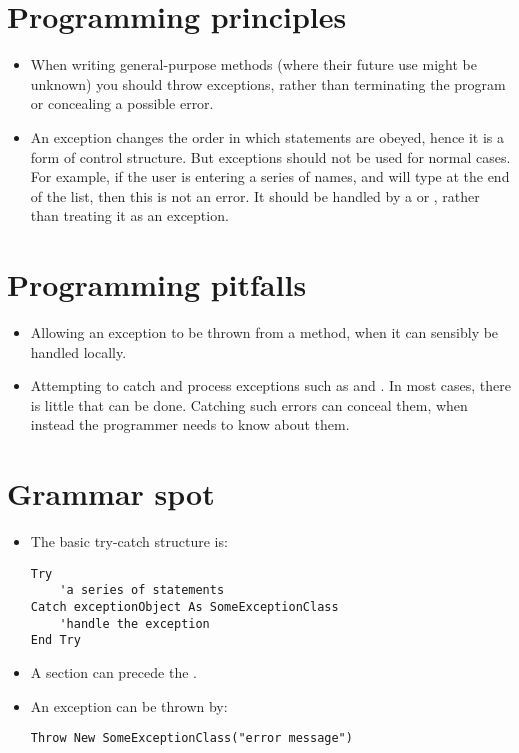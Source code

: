 	\section{Programming principles}
		\begin{itemize}
      \item When writing general-purpose methods (where their future use might be unknown) you should throw exceptions, rather than terminating the program or concealing a possible error.
      \item An exception changes the order in which statements are obeyed, hence it is a form of control structure. But exceptions should not be used for normal cases. 
				For example, if the user is entering a series of names, and will type  at the end of the list, then this is not an error. It should be handled by a  or , rather than treating it as an exception.
		\end{itemize}


	\section{Programming pitfalls}
		\begin{itemize}
      \item Allowing an exception to be thrown from a method, when it can sensibly be handled locally.
      \item Attempting to catch and process exceptions such as  and . In most cases, there is little that can be done. Catching such errors can conceal them, when instead the programmer needs to know about them.
		\end{itemize}


	\section{Grammar spot}
		\begin{itemize}
      \item The basic try-catch structure is:
				\begin{lstlisting}
Try
	'a series of statements
Catch exceptionObject As SomeExceptionClass
	'handle the exception
End Try
				\end{lstlisting}
      \item A  section can precede the .
      \item An exception can be thrown by:
				\begin{lstlisting}
Throw New SomeExceptionClass("error message")
				\end{lstlisting}
		\end{itemize}


